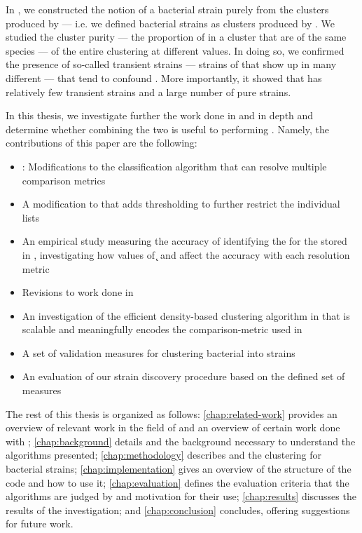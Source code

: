 In \cite{DBLP:conf/bcb/McGovernJDBKV16}, we constructed the notion of a bacterial strain purely from the clusters produced by \dbscan{} --- i.e. we defined bacterial strains as clusters produced by \dbscan{}.
We studied the cluster purity --- the proportion of \isols{} in a cluster that are of the same species --- of the entire clustering at different \minneigh{} values.
In doing so, we confirmed the presence of so-called transient \ecoli{} strains --- strains of \ecoli{} that show up in many different \spec{} --- that tend to confound \mst{}.
More importantly, it showed that \cplop{} has relatively few transient strains and a large number of pure strains.


In this thesis, we investigate further the work done in \cite{DBLP:conf/bibm/McGovernDKBVG15} and \cite{DBLP:conf/bcb/McGovernJDBKV16} in depth and determine whether combining the two is useful to performing \mst{}.
Namely, the contributions of this paper are the following:
\begin{itemize}
    \item \krapmed{}: Modifications to the \kNN{} classification algorithm that can resolve multiple comparison metrics
    \item A modification to \kNN{} that adds \a{} thresholding to further restrict the individual \kNN{} lists
    \item An empirical study measuring the accuracy of identifying the \spec{} for the \ecoli{} \isols{} stored in \cplop{}, investigating how values of \k{} and \a{} affect the accuracy with each resolution metric
    \item Revisions to work done in \cite{DBLP:conf/bibm/McGovernDKBVG15}
    \item An investigation of the efficient density-based clustering algorithm in \cite{johnson2015density} that is scalable and meaningfully encodes the comparison-metric used in \cplop{}
    \item A set of validation measures for clustering bacterial \isols{} into strains
    \item An evaluation of our strain discovery procedure based on the defined set of measures
\end{itemize}

The rest of this thesis is organized as follows:
\autoref{chap:related-work} provides an overview of relevant work in the field of \mst{} and an overview of certain work done with \cplop{};
\autoref{chap:background} details \cplop{} and the background necessary to understand the algorithms presented;
\autoref{chap:methodology} describes \krap{} and the \dbscan{} clustering for bacterial strains;
\autoref{chap:implementation} gives an overview of the structure of the code and how to use it;
\autoref{chap:evaluation} defines the evaluation criteria that the algorithms are judged by and motivation for their use;
\autoref{chap:results} discusses the results of the investigation;
and
\autoref{chap:conclusion} concludes, offering suggestions for future work.